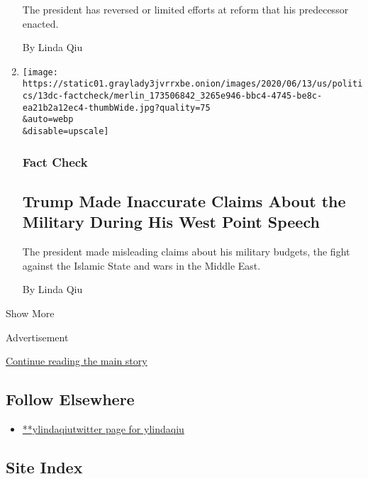 \begin{enumerate}
  The president has reversed or limited efforts at reform that his
  predecessor enacted.

  By Linda Qiu
\item
  \href{/2020/06/13/us/politics/fact-check-trump-military-west-point-speech.html}{}

  \texttt{[image: https://static01.graylady3jvrrxbe.onion/images/2020/06/13/us/politics/13dc-factcheck/merlin\_173506842\_3265e946-bbc4-4745-be8c-ea21b2a12ec4-thumbWide.jpg?quality=75\\\&auto=webp\\\&disable=upscale]}

  \hypertarget{fact-check-6}{%
  \subsubsection{Fact Check}\label{fact-check-6}}

  \hypertarget{trump-made-inaccurate-claims-about-the-military-during-his-west-point-speech}{%
  \subsection{Trump Made Inaccurate Claims About the Military During His
  West Point
  Speech}\label{trump-made-inaccurate-claims-about-the-military-during-his-west-point-speech}}

  The president made misleading claims about his military budgets, the
  fight against the Islamic State and wars in the Middle East.

  By Linda Qiu
\end{enumerate}

Show More

Advertisement

\protect\hyperlink{after-mid2}{Continue reading the main story}

\hypertarget{follow-elsewhere}{%
\subsection{Follow Elsewhere}\label{follow-elsewhere}}

\begin{itemize}
\tightlist
\item
  \href{https://twitter.com/ylindaqiu}{**ylindaqiutwitter page for
  ylindaqiu}
\end{itemize}

\hypertarget{site-index}{%
\subsection{Site Index}\label{site-index}}


